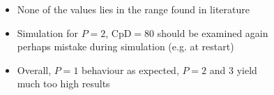 \begin{frame}[allowframebreaks]
			\begin{columns}[t]
				\column[]{5cm}
				\begin{itemize}
					\item None of the values lies in the range found in literature
					\item Simulation for $P=2$, $\text{CpD}=80$ should be examined again
					\newline \MVRightArrow \, perhaps mistake during simulation (e.g. at restart)
					\item Overall, $P=1$ behaviour as expected,  $P=2$ and $3$ yield much too high results
				\end{itemize}
				\column[]{7cm}
				\begin{figure}[htp]
					\centering		
					
				\end{figure}
			\end{columns}
		\end{frame}
